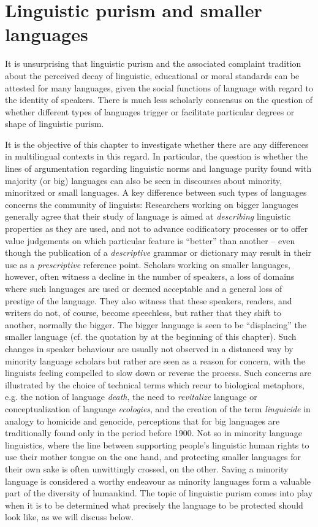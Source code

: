 \documentclass[output=paper]{langsci/langscibook}
\begin{document}
\section{Linguistic purism and smaller languages}
\label{sec:gregersen:3}

It is unsurprising that linguistic purism and the associated complaint tradition about the perceived decay of linguistic, educational or moral standards can be attested for many languages, given the social functions of language with regard to the identity of speakers. There is much less scholarly consensus on the question of whether different types of languages trigger or facilitate particular degrees or shape of linguistic purism.\par It is the objective of this chapter to investigate whether there are any differences in multilingual contexts in this regard. In particular, the question is whether the lines of argumentation regarding linguistic norms and language purity found with majority (or big) languages can also be seen in discourses about minority, minoritzed or small languages. A key difference between such types of languages concerns the community of linguists: Researchers working on bigger languages generally agree that their study of language is aimed at \textit{describing} linguistic properties as they are used, and not to advance codificatory processes or to offer value judgements on which particular feature is “better” than another – even though the publication of a \textit{descriptive} grammar or dictionary may result in their use as a \textit{prescriptive} reference point. Scholars working on smaller languages, however, often witness a decline in the number of speakers, a loss of domains where such languages are used or deemed acceptable and a general loss of prestige of the language. They also witness that these speakers, readers, and writers do not, of course, become speechless, but rather that they shift to another, normally the bigger. The bigger language is seen to be “displacing” the smaller language (cf. the quotation by \citealt{Laabs2009} at the beginning of this chapter). Such changes in speaker behaviour are usually not observed in a distanced way by minority language scholars but rather are seen as a reason for concern, with the linguists feeling compelled to slow down or reverse the process. Such concerns are illustrated by the choice of technical terms which recur to biological metaphors, e.g. the notion of language \textit{death}, the need to \textit{revitalize} language or conceptualization of language \textit{ecologies}, and the creation of the term \textit{linguicide} in analogy to homicide and genocide, perceptions that for big languages are traditionally found only in the period before 1900. Not so in minority language linguistics, where the line between supporting people’s linguistic human rights to use their mother tongue on the one hand, and protecting smaller languages for their own sake is often unwittingly crossed, on the other. Saving a minority language is considered a worthy endeavour as minority languages form a valuable part of the diversity of humankind. The topic of linguistic purism comes into play when it is to be determined what precisely the language to be protected should look like, as we will discuss below.
\end{document}
